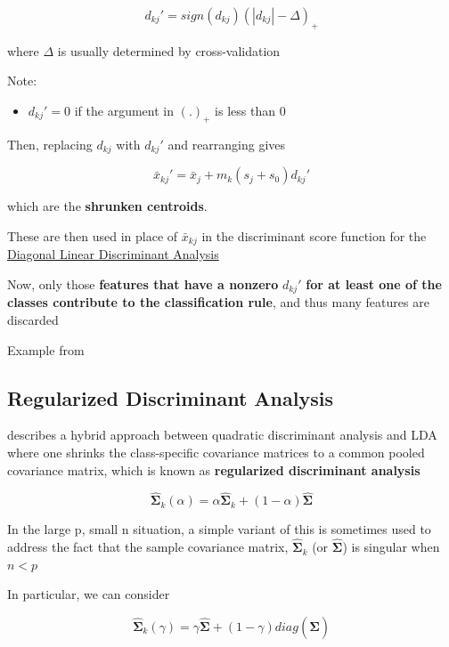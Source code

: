 \documentclass[
]{book}
\providecommand{\tightlist}{%
  \setlength{\itemsep}{0pt}\setlength{\parskip}{0pt}}
\begin{document}
\[
d_{kj}' = sign (d_{kj}) (|d_{kj}| - \Delta)_+
\]

where \(\Delta\) is usually determined by cross-validation

Note:

\begin{itemize}
\tightlist
\item
  \(d_{kj}'=0\) if the argument in \((.)_+\) is less than 0
\end{itemize}

Then, replacing \(d_{kj}\) with \(d_{kj}'\) and rearranging gives

\[
\bar{x}_{kj}' = \bar{x}_j + m_k (s_j + s_0) d_{kj}'
\]

which are the \textbf{shrunken centroids}.

These are then used in place of \(\bar{x}_{kj}\) in the discriminant score function for the \protect\hyperlink{diagonal-linear-discriminant-analysis}{Diagonal Linear Discriminant Analysis}

Now, only those \textbf{features that have a nonzero} \(d_{kj}'\) \textbf{for at least one of the classes contribute to the classification rule}, and thus many features are discarded

Example from \citep[ 18.4]{hastie2001a}

\hypertarget{regularized-discriminant-analysis}{%
\subsection{Regularized Discriminant Analysis}\label{regularized-discriminant-analysis}}

\citep[ 4.3.1]{hastie2001a} describes a hybrid approach between quadratic discriminant analysis and LDA where one shrinks the class-specific covariance matrices to a common pooled covariance matrix, which is known as \textbf{regularized discriminant analysis}

\[
\hat{\mathbf{\Sigma}}_k (\alpha) = \alpha \mathbf{\hat{\Sigma}}_k + (1- \alpha) \hat{\mathbf{\Sigma}}
\]

In the large p, small n situation, a simple variant of this is sometimes used to address the fact that the sample covariance matrix, \(\mathbf{\hat{\Sigma}}_k\) (or \(\mathbf{\hat{\Sigma}}\)) is singular when \(n < p\)

In particular, we can consider

\[
\hat{\mathbf{\Sigma}}_k (\gamma) = \gamma \hat{\mathbf{\Sigma}} + (1 - \gamma) diag (\hat{\mathbf{\Sigma}})
\]
\end{document}
